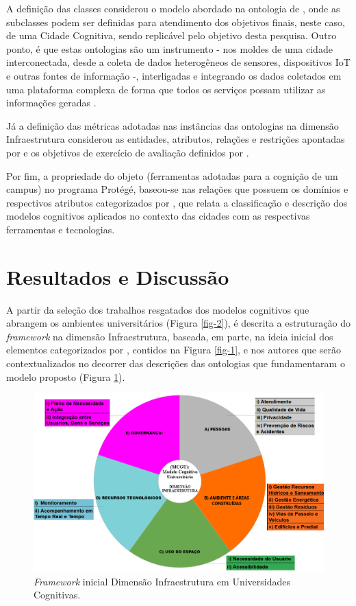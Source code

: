 \documentclass[portuguese]{textolivre}
\begin{document}
A definição das classes considerou o modelo abordado na ontologia de \textcite{rezaei2021}, onde as subclasses podem ser definidas para atendimento dos objetivos finais, neste caso, de uma Cidade Cognitiva, sendo replicável pelo objetivo desta pesquisa. Outro ponto, é que estas ontologias são um instrumento - nos moldes de uma cidade interconectada, desde a coleta de dados heterogêneos de sensores, dispositivos IoT e outras fontes de informação -, interligadas e integrando os dados coletados em uma plataforma complexa de forma que todos os serviços possam utilizar as informações geradas \cite{rezaei2021}.

Já a definição das métricas adotadas nas instâncias das ontologias na dimensão Infraestrutura considerou as entidades, atributos, relações e restrições apontadas por  e os objetivos de exercício de avaliação definidos por \textcite{mostashari2011}.

Por fim, a propriedade do objeto (ferramentas adotadas para a cognição de um campus) no programa Protégé, baseou-se nas relações que possuem os domínios e respectivos atributos categorizados por \textcite{giuriatti2024}, que relata a classificação e descrição dos modelos cognitivos aplicados no contexto das cidades com as respectivas ferramentas e tecnologias.

\section{Resultados e Discussão}

A partir da seleção dos trabalhos resgatados dos modelos cognitivos que abrangem os ambientes universitários (Figura \ref{fig-2}), é descrita a estruturação do \textit{framework} na dimensão Infraestrutura, baseada, em parte, na ideia inicial dos elementos categorizados por \textcite{giuriatti2024}, contidos na Figura \ref{fig-1}, e nos autores que serão contextualizados no decorrer das descrições das ontologias que fundamentaram o modelo proposto (Figura \ref{fig-3}).

\begin{figure}[h!]
    \centering
    \includegraphics[width=0.90\linewidth]{images/FIGURA3.png}
    \caption{\textit{Framework} inicial Dimensão Infraestrutura em Universidades Cognitivas.}
    \label{fig-3}
\end{figure}
\end{document}
